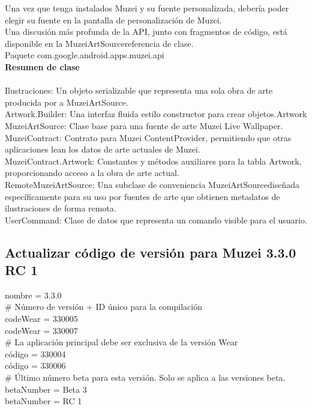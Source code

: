 \documentclass[12pt,a4paper]{article}
\begin{document}
{Una vez que tenga instalados Muzei y su fuente personalizada, debería poder elegir su fuente en la pantalla de personalización de Muzei.\\

Una discusión más profunda de la API, junto con fragmentos de código, está disponible en la MuzeiArtSourcereferencia de clase.\\
Paquete com.google.android.apps.muzei.api\\
\textbf{Resumen de clase}\\
\\
Ilustraciones:	Un objeto serializable que representa una sola obra de arte producida por a MuzeiArtSource.\\
Artwork.Builder:	Una interfaz fluida estilo constructor para crear objetos.Artwork
MuzeiArtSource:	Clase base para una fuente de arte Muzei Live Wallpaper.\\
MuzeiContract:	Contrato para Muzei ContentProvider, permitiendo que otras aplicaciones lean los datos de arte actuales de Muzei.\\
MuzeiContract.Artwork:	Constantes y métodos auxiliares para la tabla Artwork, proporcionando acceso a la obra de arte actual.\\
RemoteMuzeiArtSource:	Una subclase de conveniencia MuzeiArtSourcediseñada específicamente para su uso por fuentes de arte que obtienen metadatos de ilustraciones de forma remota.\\
UserCommand:	Clase de datos que representa un comando visible para el usuario.\\


\subsection{Actualizar código de versión para Muzei 3.3.0 RC 1}
nombre = 3.3.0\\
# Número de versión + ID único para la compilación\\
codeWear = 330005\\
codeWear = 330007\\
# La aplicación principal debe ser exclusiva de la versión Wear\\
código = 330004\\
código = 330006\\

# Último número beta para esta versión. Solo se aplica a las versiones beta.\\
betaNumber = Beta 3\\
betaNumber = RC 1\\

}
\end{document}
